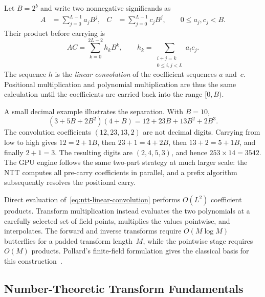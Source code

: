 Let $B=2^b$ and write two nonnegative significands as
\begin{align}
  A &= \sum_{j=0}^{L-1} a_j B^j, &
  C &= \sum_{j=0}^{L-1} c_j B^j,
  \qquad 0\le a_j,c_j < B.
  \label{eq:ntt-positional-inputs}
\end{align}
Their product before carrying is
\begin{equation}
  AC = \sum_{k=0}^{2L-2} h_k B^k,
  \qquad
  h_k = \sum_{\substack{i+j=k\\0\le i,j<L}} a_i c_j.
  \label{eq:ntt-linear-convolution}
\end{equation}
The sequence $h$ is the \emph{linear convolution} of the coefficient sequences
$a$ and~$c$.  Positional multiplication and polynomial multiplication are thus
the same calculation until the coefficients are carried back into the range
$[0,B)$.

A small decimal example illustrates the separation.  With $B=10$,
\begin{equation}
  (3+5B+2B^2)(4+B)=12+23B+13B^2+2B^3.
\end{equation}
The convolution coefficients $(12,23,13,2)$ are not decimal digits.  Carrying
from low to high gives $12=2+1B$, then $23+1=4+2B$, then
$13+2=5+1B$, and finally $2+1=3$.  The resulting digits are
$(2,4,5,3)$, and hence
$253\mathbin{\times}14=3542$.  The GPU engine follows the same two-part
strategy at much larger scale: the NTT computes all pre-carry coefficients in
parallel, and a prefix algorithm subsequently resolves the positional carry.

Direct evaluation of~\eqref{eq:ntt-linear-convolution} performs $O(L^2)$
coefficient products.  Transform multiplication instead evaluates the two
polynomials at a carefully selected set of field points, multiplies the values
pointwise, and interpolates.  The forward and inverse transforms require
$O(M\log M)$ butterflies for a padded transform length~$M$, while the pointwise
stage requires $O(M)$ products.  Pollard's finite-field formulation gives the
classical basis for this construction~\cite{Pollard1971FiniteFieldFFT}.

\subsection{Number-Theoretic Transform Fundamentals}
\label{sec:ntt-multiply}

